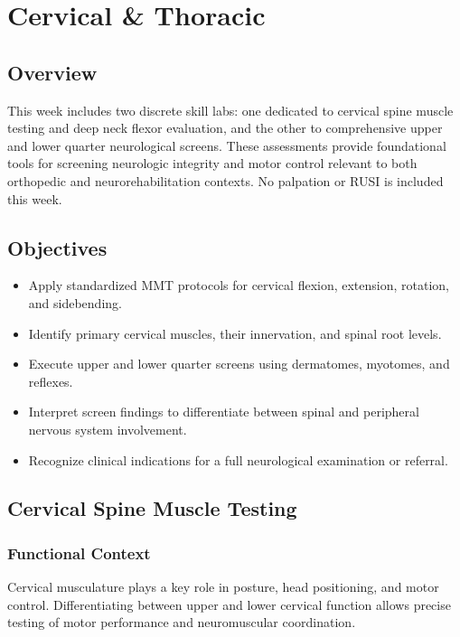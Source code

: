 \chapter{Cervical \& Thoracic}\label{chp:cervical_thoracic }

\section*{Overview}

This week includes two discrete skill labs: one dedicated to cervical spine muscle testing and deep neck flexor evaluation, and the other to comprehensive upper and lower quarter neurological screens. These assessments provide foundational tools for screening neurologic integrity and motor control relevant to both orthopedic and neurorehabilitation contexts. No palpation or RUSI is included this week.

\section*{Objectives}
\begin{itemize}
  \item Apply standardized MMT protocols for cervical flexion, extension, rotation, and sidebending.
  \item Identify primary cervical muscles, their innervation, and spinal root levels.
  \item Execute upper and lower quarter screens using dermatomes, myotomes, and reflexes.
  \item Interpret screen findings to differentiate between spinal and peripheral nervous system involvement.
  \item Recognize clinical indications for a full neurological examination or referral.
\end{itemize}

\section*{Cervical Spine Muscle Testing}

\subsection*{Functional Context}

Cervical musculature plays a key role in posture, head positioning, and motor control. Differentiating between upper and lower cervical function allows precise testing of motor performance and neuromuscular coordination.

